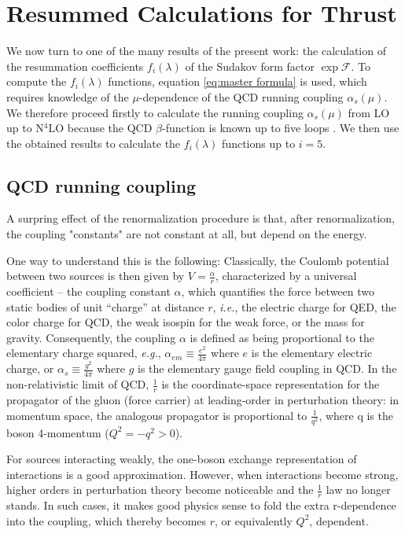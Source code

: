 \documentclass[../main.tex]{subfiles}
\begin{document}
\chapter{Resummed Calculations for Thrust}\label{ch:calculations}

We now turn to one of the many results of the present work: the calculation of the resummation coefficients $f_i(\lambda)$ of the
Sudakov form factor $\exp{\mathcal{F}}$. To compute the $f_i(\lambda)$ functions, equation \cref{eq:master formula} is used, which
requires knowledge of the $\mu$-dependence of the QCD running coupling $\alpha_s(\mu)$.
We therefore proceed firstly to calculate the running coupling $\alpha_s(\mu)$ from LO up to N$^4$LO because the QCD $\beta$-function is known up to five loops \cite{Herzog_2017}. 
We then use the obtained results to calculate the $f_i(\lambda)$ functions up to $i = 5$.

\section{QCD running coupling} \label{sec:QCD_running_coupling}

A surpring effect of the renormalization procedure is that, after renormalization, the coupling "constants" are not constant
at all, but depend on the energy.

One way to understand this is the following: Classically, the Coulomb potential between two sources is then given by $V = \frac{\alpha}{r}$, 
characterized by a universal coefficient -- the coupling constant $\alpha$, which 
quantifies the force between two static bodies of unit “charge” at distance $r$,
\textit{i.e.}, the electric charge for QED, the color charge for QCD, the weak isospin
for the weak force, or the mass for gravity. Consequently, the coupling $\alpha$ is defined
as being proportional to the elementary charge squared, \textit{e.g.}, $\alpha_{em} \equiv \frac{e^2}{4\pi}$ where 
$e$ is the elementary electric charge, or $\alpha_s \equiv \frac{g^2}{4\pi}$ where $g$ is the elementary gauge field
coupling in QCD.
In the non-relativistic limit of QCD, $\frac{1}{r}$ is the coordinate-space representation
for the propagator of the gluon (force carrier) at leading-order in perturbation
theory: in momentum space, the analogous propagator is proportional to $\frac{1}{q^2}$, where q is
the boson 4-momentum ($Q^2=-q^2>0$).

For sources interacting weakly, the one-boson exchange representation of interactions
is a good approximation. However, when interactions become strong, higher orders in perturbation theory become noticeable and the
$\frac{1}{r}$ law no longer stands. In such cases, it makes good physics sense to fold the extra r-dependence
into the coupling, which thereby becomes $r$, or equivalently $Q^2$, dependent.
\end{document}
